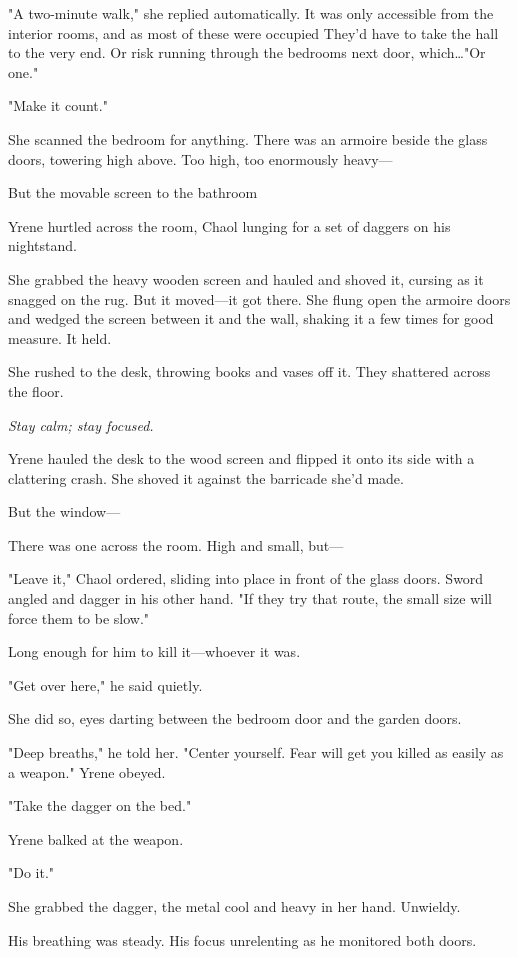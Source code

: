 "A two-minute walk," she replied automatically.
It was only accessible from the interior rooms, and as most of these were occupied 
They'd have to take the hall to the very end.
Or risk running through the bedrooms next door, which\ldots "Or one."

"Make it count."

She scanned the bedroom for anything.
There was an armoire beside the glass doors, towering high above.
Too high, too enormously heavy---

But the movable screen to the bathroom 

Yrene hurtled across the room, Chaol lunging for a set of daggers on his nightstand.

She grabbed the heavy wooden screen and hauled and shoved it, cursing as it snagged on the rug.
But it moved---it got there.
She flung open the armoire doors and wedged the screen between it and the wall, shaking it a few times for good measure.
It held.

She rushed to the desk, throwing books and vases off it.
They shattered across the floor.

\emph{Stay calm; stay focused.}

Yrene hauled the desk to the wood screen and flipped it onto its side with a clattering crash.
She shoved it against the barricade she'd made.

But the window---

There was one across the room.
High and small, but---

"Leave it," Chaol ordered, sliding into place in front of the glass doors.
Sword angled and dagger in his other hand.
"If they try that route, the small size will force them to be slow."

Long enough for him to kill it---whoever it was.

"Get over here," he said quietly.

She did so, eyes darting between the bedroom door and the garden doors.

"Deep breaths," he told her.
"Center yourself.
Fear will get you killed as easily as a weapon."
Yrene obeyed.

"Take the dagger on the bed."

Yrene balked at the weapon.

"Do it."

She grabbed the dagger, the metal cool and heavy in her hand.
Unwieldy.

His breathing was steady.
His focus unrelenting as he monitored both doors.

